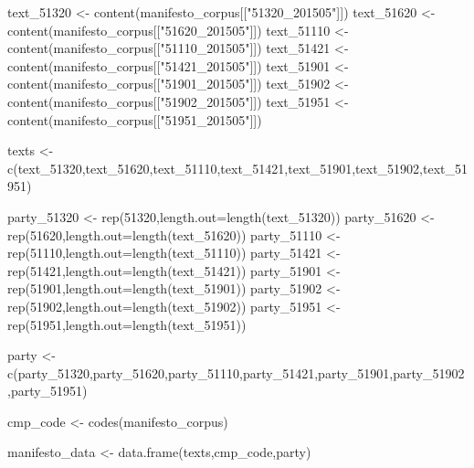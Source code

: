 \documentclass[
]{book}
\newenvironment{Shaded}{\begin{snugshade}}{\end{snugshade}}
\newcommand{\AttributeTok}[1]{\textcolor[rgb]{0.77,0.63,0.00}{#1}}
\newcommand{\DecValTok}[1]{\textcolor[rgb]{0.00,0.00,0.81}{#1}}
\newcommand{\FunctionTok}[1]{\textcolor[rgb]{0.00,0.00,0.00}{#1}}
\newcommand{\NormalTok}[1]{#1}
\newcommand{\OtherTok}[1]{\textcolor[rgb]{0.56,0.35,0.01}{#1}}
\newcommand{\StringTok}[1]{\textcolor[rgb]{0.31,0.60,0.02}{#1}}
\begin{document}
\begin{Shaded}
\begin{Highlighting}[]
\NormalTok{text\_51320 }\OtherTok{\textless{}{-}} \FunctionTok{content}\NormalTok{(manifesto\_corpus[[}\StringTok{"51320\_201505"}\NormalTok{]])}
\NormalTok{text\_51620 }\OtherTok{\textless{}{-}} \FunctionTok{content}\NormalTok{(manifesto\_corpus[[}\StringTok{"51620\_201505"}\NormalTok{]])}
\NormalTok{text\_51110 }\OtherTok{\textless{}{-}} \FunctionTok{content}\NormalTok{(manifesto\_corpus[[}\StringTok{"51110\_201505"}\NormalTok{]])}
\NormalTok{text\_51421 }\OtherTok{\textless{}{-}} \FunctionTok{content}\NormalTok{(manifesto\_corpus[[}\StringTok{"51421\_201505"}\NormalTok{]])}
\NormalTok{text\_51901 }\OtherTok{\textless{}{-}} \FunctionTok{content}\NormalTok{(manifesto\_corpus[[}\StringTok{"51901\_201505"}\NormalTok{]])}
\NormalTok{text\_51902 }\OtherTok{\textless{}{-}} \FunctionTok{content}\NormalTok{(manifesto\_corpus[[}\StringTok{"51902\_201505"}\NormalTok{]])}
\NormalTok{text\_51951 }\OtherTok{\textless{}{-}} \FunctionTok{content}\NormalTok{(manifesto\_corpus[[}\StringTok{"51951\_201505"}\NormalTok{]])}

\NormalTok{texts }\OtherTok{\textless{}{-}} \FunctionTok{c}\NormalTok{(text\_51320,text\_51620,text\_51110,text\_51421,text\_51901,text\_51902,text\_51951)}

\NormalTok{party\_51320 }\OtherTok{\textless{}{-}} \FunctionTok{rep}\NormalTok{(}\DecValTok{51320}\NormalTok{,}\AttributeTok{length.out=}\FunctionTok{length}\NormalTok{(text\_51320))}
\NormalTok{party\_51620 }\OtherTok{\textless{}{-}} \FunctionTok{rep}\NormalTok{(}\DecValTok{51620}\NormalTok{,}\AttributeTok{length.out=}\FunctionTok{length}\NormalTok{(text\_51620))}
\NormalTok{party\_51110 }\OtherTok{\textless{}{-}} \FunctionTok{rep}\NormalTok{(}\DecValTok{51110}\NormalTok{,}\AttributeTok{length.out=}\FunctionTok{length}\NormalTok{(text\_51110))}
\NormalTok{party\_51421 }\OtherTok{\textless{}{-}} \FunctionTok{rep}\NormalTok{(}\DecValTok{51421}\NormalTok{,}\AttributeTok{length.out=}\FunctionTok{length}\NormalTok{(text\_51421))}
\NormalTok{party\_51901 }\OtherTok{\textless{}{-}} \FunctionTok{rep}\NormalTok{(}\DecValTok{51901}\NormalTok{,}\AttributeTok{length.out=}\FunctionTok{length}\NormalTok{(text\_51901))}
\NormalTok{party\_51902 }\OtherTok{\textless{}{-}} \FunctionTok{rep}\NormalTok{(}\DecValTok{51902}\NormalTok{,}\AttributeTok{length.out=}\FunctionTok{length}\NormalTok{(text\_51902))}
\NormalTok{party\_51951 }\OtherTok{\textless{}{-}} \FunctionTok{rep}\NormalTok{(}\DecValTok{51951}\NormalTok{,}\AttributeTok{length.out=}\FunctionTok{length}\NormalTok{(text\_51951))}

\NormalTok{party }\OtherTok{\textless{}{-}} \FunctionTok{c}\NormalTok{(party\_51320,party\_51620,party\_51110,party\_51421,party\_51901,party\_51902,party\_51951)}

\NormalTok{cmp\_code }\OtherTok{\textless{}{-}} \FunctionTok{codes}\NormalTok{(manifesto\_corpus)}

\NormalTok{manifesto\_data }\OtherTok{\textless{}{-}} \FunctionTok{data.frame}\NormalTok{(texts,cmp\_code,party)}
\end{Highlighting}
\end{Shaded}
\end{document}
